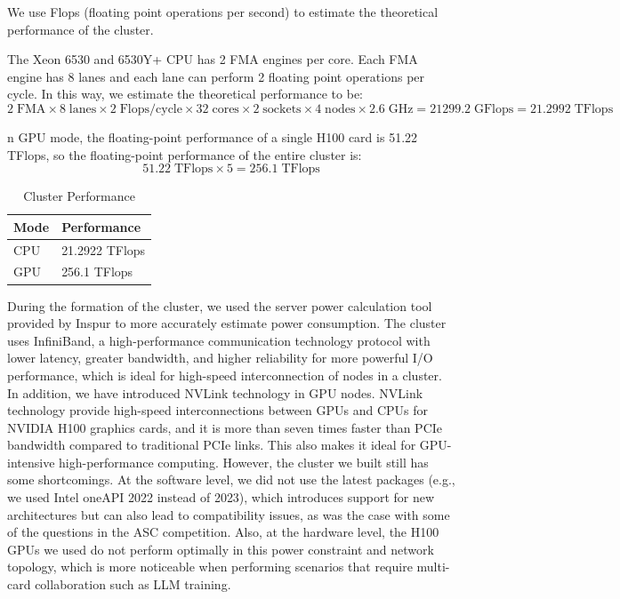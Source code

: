 \documentclass[a4paper,12pt]{article}
\begin{document}
We use Flops (floating point operations per second) to estimate the theoretical performance of the cluster.

The Xeon 6530 and 6530Y+ CPU has 2 FMA engines per core. Each FMA engine has 8 lanes and each lane can perform 2 floating point operations per cycle. In this way, we estimate the theoretical performance to be:
\begin{equation*}
2\;\text{FMA} \times 8\;\text{lanes} \times 2\;\text{Flops/cycle} \times 32\;\text{cores} \times 2\;\text{sockets} \times 4\;\text{nodes} \times 2.6\;\text{GHz} = 21299.2 \;\text{GFlops} = 21.2992 \;\text{TFlops}
\end{equation*}

n GPU mode, the floating-point performance of a single H100 card is 51.22 TFlops, so the floating-point performance of the entire cluster is:
\begin{equation*}
51.22\;\text{TFlops} \times 5 = 256.1 \;\text{TFlops}
\end{equation*}

\begin{table}[H]
\centering
\caption{Cluster Performance}
\vspace{0.5cm}
\begin{tabular}{|l|l|}
\toprule
Mode & Performance \\
\midrule
CPU & 21.2922 TFlops \\
\hline
GPU & 256.1 TFlops \\
\bottomrule
\end{tabular}
\end{table}

During the formation of the cluster, we used the server power calculation tool provided by Inspur to more accurately estimate power consumption. The cluster uses InfiniBand, a high-performance communication technology protocol with lower latency, greater bandwidth, and higher reliability for more powerful I/O performance, which is ideal for high-speed interconnection of nodes in a cluster. In addition, we have introduced NVLink technology in GPU nodes. NVLink technology provide high-speed interconnections between GPUs and CPUs for NVIDIA H100 graphics cards, and it is more than seven times faster than PCIe bandwidth compared to traditional PCIe links. This also makes it ideal for GPU-intensive high-performance computing. However, the cluster we built still has some shortcomings. At the software level, we did not use the latest packages (e.g., we used Intel oneAPI 2022 instead of 2023), which introduces support for new architectures but can also lead to compatibility issues, as was the case with some of the questions in the ASC competition. Also, at the hardware level, the H100 GPUs we used do not perform optimally in this power constraint and network topology, which is more noticeable when performing scenarios that require multi-card collaboration such as LLM training.
\end{document}
